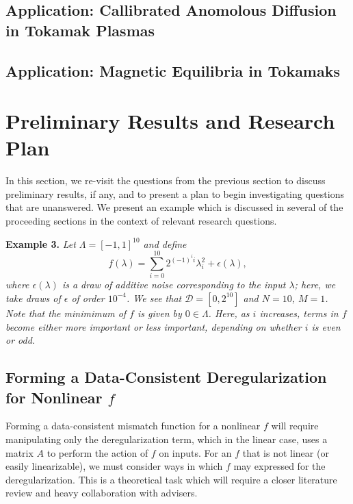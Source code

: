 \documentclass{amsart}
\begin{document}
\subsection{Application: Callibrated Anomolous Diffusion in Tokamak Plasmas}

\subsection{Application: Magnetic Equilibria in Tokamaks}





\section{Preliminary Results and Research Plan}

In this section, we re-visit the questions from the previous section to discuss preliminary results, if any, and to present a plan to begin investigating questions that are unanswered. We present an example which is discussed in several of the proceeding sections in the context of relevant research questions.

\vspace{.125cm}

\noindent \textbf{Example 3.} \textit{Let $\Lambda=[-1,1]^{10}$ and define $$f(\lambda)=\sum_{i=0}^{10} 2^{(-1)^i i}\lambda_i^2+\epsilon(\lambda),$$ where $\epsilon(\lambda)$ is a draw of additive noise corresponding to the input $\lambda$; here, we take draws of $\epsilon$ of order $10^{-4}$. We see that $\mathcal{D}=[0,2^{10}]$ and $N=10$, $M=1$. Note that the minimimum of $f$ is given by $0 \in \Lambda$. Here, as $i$ increases, terms in $f$ become either more important or less important, depending on whether $i$ is even or odd.}

\subsection{Forming a Data-Consistent Deregularization for Nonlinear $f$} Forming a data-consistent mismatch function for a nonlinear $f$ will require manipulating only the deregularization term, which in the linear case, uses a matrix $A$ to perform the action of $f$ on inputs. For an $f$ that is not linear (or easily linearizable), we must consider ways in which $f$ may expressed for the deregularization. This is a theoretical task which will require a closer literature review and heavy collaboration with advisers.
\end{document}

